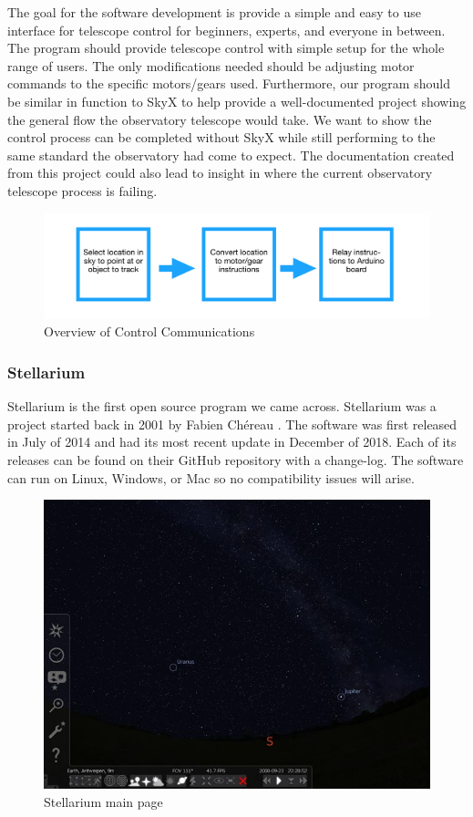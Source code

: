\documentclass[12pt]{article}
\begin{document}
The goal for the software development is provide a simple and easy to use interface for telescope control for beginners, experts, and everyone in between. The program should provide telescope control with simple setup for the whole range of users. The only modifications needed should be adjusting motor commands to the specific motors/gears used. Furthermore, our program should be similar in function to SkyX to help provide a well-documented project showing the general flow the observatory telescope would take. We want to show the control process can be completed without SkyX while still performing to the same standard the observatory had come to expect. The documentation created from this project could also lead to insight in where the current observatory telescope process is failing.

\begin{figure}[h]
	\centering
	\includegraphics[width=0.75\linewidth]{techOver}
	\caption{Overview of Control Communications}
  \label{fig:techOver}
\end{figure}

\subsubsection{Stellarium}

Stellarium is the first open source program we came across. Stellarium was a project started back in 2001 by Fabien Chéreau \cite{stell}. The software was first released in July of 2014 and had its most recent update in December of 2018. Each of its releases can be found on their GitHub repository with a change-log. The software can run on Linux, Windows, or Mac so no compatibility issues will arise.

\begin{figure}[h]
	\centering
	\includegraphics[width=0.75\linewidth]{stell}
	\caption{Stellarium main page}
  \label{fig:stell}
\end{figure}
\end{document}
